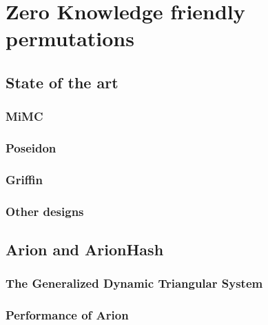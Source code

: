 \documentclass[target=mst]{thud}
\theoremstyle{definition}
\theoremstyle{plain}
\theoremstyle{remark}
\begin{document}



\part{Zero Knowledge friendly permutations}\label{part:zk-hash}
\chapter{State of the art}
\section{MiMC}
\section{Poseidon}
\section{Griffin}
\section{Other designs}
\chapter{Arion and ArionHash}
\section{The Generalized Dynamic Triangular System}
\section{Performance of Arion}




\backmatter%
\end{document}
